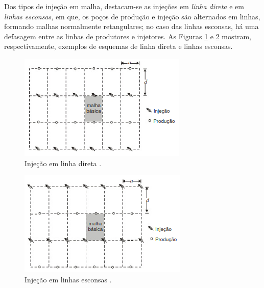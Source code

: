 Dos tipos de injeção em malha, destacam-se as injeções em \textit{linha direta} e em \textit{linhas esconsas}, em que, os poços de produção e injeção são alternados em linhas, formando malhas normalmente retangulares; no caso das linhas esconsas, há uma defasagem entre as linhas de produtores e injetores. As Figuras \ref{fig:rev_injld} e \ref{fig:rev_injle} mostram, respectivamente, exemplos de esquemas de linha direta e linhas esconsas.

\begin{figure}[!ht]
\centering
\includegraphics[width=.6\textwidth]{figs/revisao/revisao_injld.png}
\caption{Injeção em linha direta \cite[p. 567]{engres}.}
\label{fig:rev_injld}
\end{figure}

\begin{figure}[!ht]
\centering
\includegraphics[width=.6\textwidth]{figs/revisao/revisao_injle.png}
\caption{Injeção em linhas esconsas \cite[p. 567]{engres}.}
\label{fig:rev_injle}
\end{figure}

